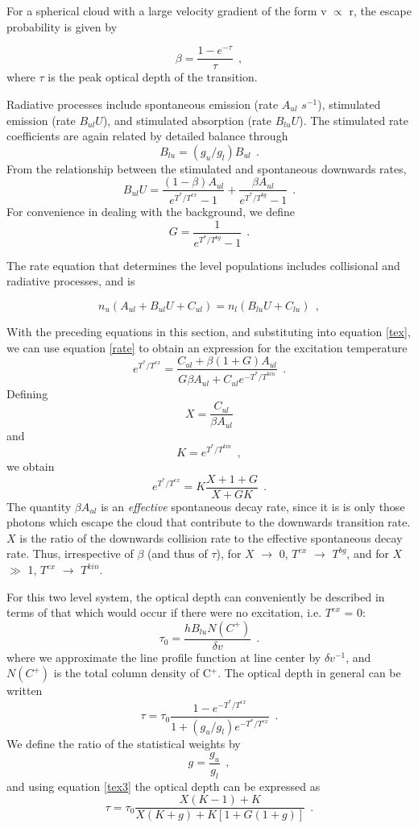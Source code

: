 \documentclass[12pt]{aastex}
\def \lp{\>\> .}
\def \lc{\>\> ,}
\def \cp{C$^+$}
\def \be{\begin{equation}}
\def \ee{   \end{equation}}
\def \lc{\>\> ,}
\def \lp{\>\> .}
\begin{document}
For a spherical cloud with a large velocity gradient of the form v $\propto$ r, the escape probability is given by 

\be
\beta = \frac{1 - e^{-\tau}}{\tau} \lc
\ee
where $\tau$ is the peak optical depth of the transition.

Radiative processes include spontaneous emission (rate $A_{ul}$ $s^{-1}$), stimulated emission (rate $B_{ul}U$), and stimulated absorption (rate $B_{lu}U$).  The stimulated rate coefficients are again related by detailed balance through
\be
B_{lu} = (g_u / g_l)B_{ul} \lp
\ee
From the relationship between the stimulated and spontaneous downwards rates,
\be
B_{ul}U = \frac{(1 - \beta) A_{ul}}{e^{T^*/T^{ex}} - 1} + \frac{\beta A_{ul}}{e^{T^*/T^{bg}} - 1} \lp
\ee
For convenience in dealing with the background, we define 
\be
G = \frac{1}{e^{T^*/T^{bg}} - 1} \lp
\ee

The rate equation that determines the level populations includes collisional and radiative processes, and is

\be
n_u(A_{ul} + B_{ul}U + C_{ul}) = n_l(B_{lu}U + C_{lu}) \lc
\label{rate}
\ee

With the preceding equations in this section, and substituting into equation \ref{tex}, we can use equation \ref{rate} to obtain an expression for the excitation temperature
\be
e^{T^* / T^{ex}} = \frac{C_{ul} + \beta(1 + G)A_{ul}}{G\beta A_{ul} + C_{ul}e^{-T^* /T^{kin}}} \lp
\ee
Defining
\be
X = \frac{C_{ul}}{\beta A_{ul}}
\label{X}
\ee
and
\be
K = e^{T^*/T^{kin}} \lc
\ee
we obtain
\be
e^{T^* / T^{ex}} = K\frac{X + 1 + G}{X + GK} \lp
\label{tex3}
\ee 
The quantity $\beta A_{ul}$ is an {\it effective} spontaneous decay rate, since it is is only those photons which escape the cloud that contribute to the downwards transition rate.  $X$ is the  ratio of the downwards collision rate to the effective spontaneous decay rate. 
Thus, irrespective of $\beta$ (and thus of $\tau$), for $X$ $\rightarrow$ 0, $T^{ex}$ $\rightarrow$ $T^{bg}$, and for $X$ $\gg$ 1, $T^{ex}$ $\rightarrow$ $T^{kin}$.  

For this two level system, the optical depth can conveniently be described in terms of that which would occur if there were no excitation, i.e. $T^{ex}$ = 0:
\be
\tau_0 = \frac{hB_{lu}N(C^+)}{\delta v} \lp
\label{tau_0}
\ee
where we approximate the line profile function at line center by $\delta v^{-1}$, and $N(C^+)$ is the total column density of \cp.  
The optical depth in general can be written
\be
\tau = \tau_0 \frac{1 - e^{-T^*/T^{ex}}}{1 + (g_u/g_l)e^{-T^*/T^{ex}}} \lp
\ee
We define the ratio of the statistical weights by
\be
g = \frac{g_u}{g_l} \lc
\ee
and using equation \ref{tex3} the optical depth can be expressed as
\be
\tau = \tau_0 \frac{X(K - 1) + K}{X(K + g) + K[1 + G(1 + g)]} \lp
\label{tau1}
\ee
\end{document}
